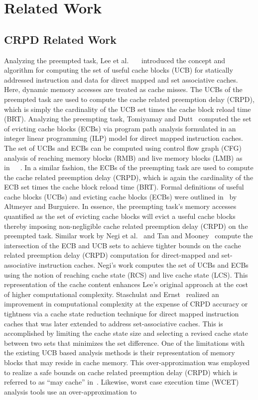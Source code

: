 \section{Related Work}\label{sec:related}

\subsection {CRPD Related Work}\label{sec:crpd_related_work}
Analyzing the preempted task, Lee et al.~\cite{lee:96}~\cite{lee:97}~\cite{lee:98} introduced the concept and algorithm for computing the set of useful cache blocks (UCB) for statically addressed instruction and data for direct mapped and set associative caches.  Here, dynamic memory accesses are treated as cache misses.  The UCBs of the preempted task are used to compute the cache related preemption delay (CRPD), which is simply the cardinality of the UCB set times the cache block reload time (BRT).  Analyzing the preempting task, Tomiyamay and Dutt~\cite{tomiyamay:00} computed the set of evicting cache blocks (ECBs) via program path analysis formulated in an integer linear programming (ILP) model for direct mapped instruction caches.  The set of UCBs and ECBs can be computed using control flow graph (CFG) analysis of reaching memory blocks (RMB) and live memory blocks (LMB) as in~\cite{lee:96}~\cite{lee:97}~\cite{lee:98}. In a similar fashion, the ECBs of the preempting task are used to compute the cache related preemption delay (CRPD), which is again the cardinality of the ECB set times the cache block reload time (BRT). Formal definitions of useful cache blocks (UCBs) and evicting cache blocks (ECBs) were outlined in~\cite{altmeyer:11c} by Altmeyer and Burguiere.  In essence, the preempting task’s memory accesses quantified as the set of evicting cache blocks will evict a useful cache blocks thereby imposing non-negligible cache related preemption delay (CRPD) on the preempted task.  Similar work by Negi et al.~\cite{negi:03} and Tan and Mooney~\cite{tan:04} compute the intersection of the ECB and UCB sets to achieve tighter bounds on the cache related preemption delay (CRPD) computation for direct-mapped and set-associative instruction caches. Negi’s work computes the set of UCBs and ECBs using the notion of reaching cache state (RCS) and live cache state (LCS). This representation of the cache content enhances Lee’s original approach at the cost of higher computational complexity. Staschulat and Ernst~\cite{staschulat:05c} realized an improvement in computational complexity at the expense of CRPD accuracy or tightness via a cache state reduction technique for direct mapped instruction caches that was later extended to address set-associative caches. This is accomplished by limiting the cache state size and selecting a revised cache state between two sets that minimizes the set difference.  One of the limitations with the existing UCB based analysis methods is their representation of memory blocks that may reside in cache memory.  This over-approximation was employed to realize a safe bounds on cache related preemption delay (CRPD) which is referred to as “may cache” in~\cite{altmeyer:11c}.  Likewise, worst case execution time (WCET) analysis tools use an over-approximation to 